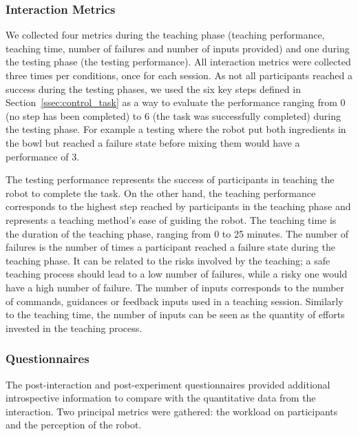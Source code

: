 \subsubsection{Interaction Metrics}

We collected four metrics during the teaching phase (teaching performance, teaching time, number of failures and number of inputs provided) and one during the testing phase (the testing performance). All interaction metrics were collected three times per conditions, once for each session. As not all participants reached a success during the testing phases, we used the six key steps defined in Section~\ref{ssec:control_task} as a way to evaluate the performance ranging from 0 (no step has been completed) to 6 (the task was successfully completed) during the testing phase. For example a testing where the robot put both ingredients in the bowl but reached a failure state before mixing them would have a performance of 3. 

The testing performance represents the success of participants in teaching the robot to complete the task. On the other hand, the teaching performance corresponds to the highest step reached by participants in the teaching phase and represents a teaching method's ease of guiding the robot. The teaching time is the duration of the teaching phase, ranging from 0 to 25 minutes. The number of failures is the number of times a participant reached a failure state during the teaching phase. It can be related to the risks involved by the teaching; a safe teaching process should lead to a low number of failures, while a risky one would have a high number of failure. The number of inputs corresponds to the number of commands, guidances or feedback inputs used in a teaching session. Similarly to the teaching time, the number of inputs can be seen as the quantity of efforts invested in the teaching process.

\subsubsection{Questionnaires} \label{ssec:control_questionnaires}

The post-interaction and post-experiment questionnaires provided additional introspective information to compare with the quantitative data from the interaction. Two principal metrics were gathered: the workload on participants and the perception of the robot. 

